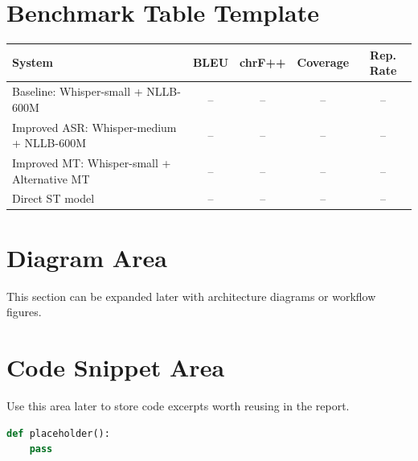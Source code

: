 \documentclass[11pt,a4paper]{article}
\begin{document}
\section{Benchmark Table Template}

\begin{longtable}{>{\raggedright\arraybackslash}p{}cccc}
\toprule
System & BLEU & chrF++ & Coverage & Rep. Rate \\
\midrule
Baseline: Whisper-small + NLLB-600M & -- & -- & -- & -- \\
Improved ASR: Whisper-medium + NLLB-600M & -- & -- & -- & -- \\
Improved MT: Whisper-small + Alternative MT & -- & -- & -- & -- \\
Direct ST model & -- & -- & -- & -- \\
\bottomrule
\end{longtable}

\section{Diagram Area}

This section can be expanded later with architecture diagrams or workflow figures.

\begin{center}
\end{center}

\section{Code Snippet Area}

Use this area later to store code excerpts worth reusing in the report.

\begin{lstlisting}[language=Python, caption={Placeholder for future code excerpt}]
def placeholder():
    pass
\end{lstlisting}
\end{document}
